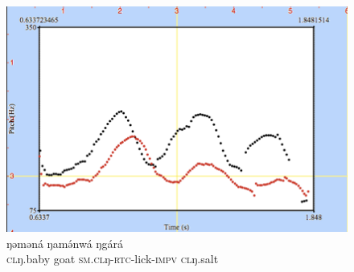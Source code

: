 \begin{figure}
  \includegraphics[width=\linewidth]{figures/fig-ch4-5.png}
  \caption{\gll ŋəməná ŋamə́nwá ŋgárá\\
\textsc{cl}ŋ.baby goat \textsc{sm}.\textsc{cl}ŋ-\textsc{rtc}-lick-\textsc{impv} \textsc{cl}ŋ.salt\\ \trans }
  \label{fig:4-5}
\end{figure}

